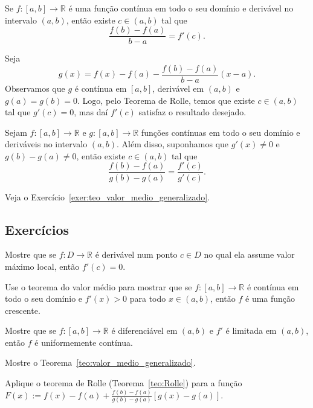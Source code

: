 \begin{teo}
  Se $f:[a, b]\to\mathbb{R}$ é uma função contínua em todo o seu domínio e derivável no intervalo $(a, b)$, então existe $c\in (a, b)$ tal que
  \begin{equation}
    \frac{f(b) - f(a)}{b - a} = f'(c).
  \end{equation}
\end{teo}
\begin{dem}
  Seja
  \begin{equation}
    g(x) = f(x) - f(a) - \frac{f(b) - f(a)}{b - a}(x-a).
  \end{equation}
Observamos que $g$ é contínua em $[a, b]$, derivável em $(a, b)$ e $g(a)=g(b)=0$. Logo, pelo Teorema de Rolle, temos que existe $c\in (a, b)$ tal que $g'(c) = 0$, mas daí $f'(c)$ satisfaz o resultado desejado.
\end{dem}

\begin{teo}\label{teo:valor_medio_generalizado}
  Sejam $f:[a, b]\to\mathbb{R}$ e $g:[a, b]\to\mathbb{R}$ funções contínuas em todo o seu domínio e deriváveis no intervalo $(a, b)$. Além disso, suponhamos que $g'(x)\neq 0$ e $g(b)-g(a)\neq 0$, então existe $c\in (a, b)$ tal que
  \begin{equation}
    \frac{f(b) - f(a)}{g(b) - g(a)} = \frac{f'(c)}{g'(c)}.
  \end{equation}
\end{teo}
\begin{dem}
  Veja o Exercício~\ref{exer:teo_valor_medio_generalizado}.
\end{dem}

\subsection*{Exercícios}

\begin{exer}\label{exer:ponto_de_minimo}
  Mostre que se $f:D\to\mathbb{R}$ é derivável num ponto $c\in D$ no qual ela assume valor máximo local, então $f'(c) = 0$.   
\end{exer}

\begin{exer}
  Use o teorema do valor médio para mostrar que se $f:[a, b]\to \mathbb{R}$ é contínua em todo o seu domínio e $f'(x)>0$ para todo $x\in (a, b)$, então $f$ é uma função crescente.
\end{exer}

\begin{exer}
  Mostre que se $f:[a, b]\to\mathbb{R}$ é diferenciável em $(a, b)$ e $f'$ é limitada em $(a, b)$, então $f$ é uniformemente contínua.
\end{exer}

\begin{exer}\label{exer:teo_valor_medio_generalizado}
  Mostre o Teorema~\ref{teo:valor_medio_generalizado}.
\end{exer}
\begin{resp}
  Aplique o teorema de Rolle (Teorema~\ref{teo:Rolle}) para a função $\displaystyle F(x) := f(x) - f(a) + \frac{f(b)-f(a)}{g(b)-g(a)}[g(x)-g(a)]$.
\end{resp}